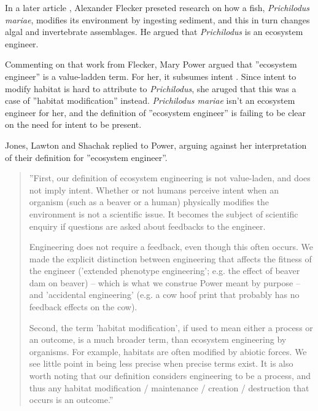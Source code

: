 \documentclass[graybox,envcountchap,sectrefs]{svmono}
\begin{document}
In a later article \cite{flecker1996ecosystem}, Alexander Flecker preseted research on how a fish, \textit{Prichilodus mariae}, modifies its environment by ingesting sediment, and this in turn changes algal and invertebrate assemblages. He argued that \textit{Prichilodus} is an ecosystem engineer. 

Commenting on that work from Flecker, Mary Power argued that ''ecosystem engineer'' is a value-ladden term. For her, it subsumes intent \cite{power1997estimating}. Since intent to modify habitat is hard to attribute to \textit{Prichilodus}, she aruged that this was a case of ''habitat modification'' instead. \textit{Prichilodus mariae} isn't an ecosystem engineer for her, and the definition of ''ecosystem engineer'' is failing to be clear on the need for intent to be present.

Jones, Lawton and Shachak replied to Power, arguing against her interpretation of their definition for ''ecosystem engineer''.

\begin{quote}
''First, our definition of ecosystem engineering is not value-laden, and does not imply intent. Whether or not humans perceive intent when an organism (such as a beaver or a human) physically modifies the environment is not a scientific issue. It becomes the subject of scientific enquiry if questions are asked about feedbacks to the engineer. 

Engineering does not require a feedback, even though this often occurs. We made the explicit distinction between engineering that affects the fitness of the engineer ('extended phenotype engineering'; e.g. the effect of beaver dam on beaver) -- which is what we construe Power meant by purpose -- and 'accidental engineering' (e.g. a cow hoof print that probably has no feedback effects on the cow).

Second, the term 'habitat modification', if used to mean either a process or an outcome, is a much broader term, than ecosystem engineering by organisms. For example, habitats are often modified by abiotic forces. We see little point in being less precise when precise terms exist. It is also worth noting that our definition considers engineering to be a process, and thus any habitat modification / maintenance / creation / destruction that occurs is an outcome.'' \cite{jones1997ecosystem}
\end{quote}
\end{document}
